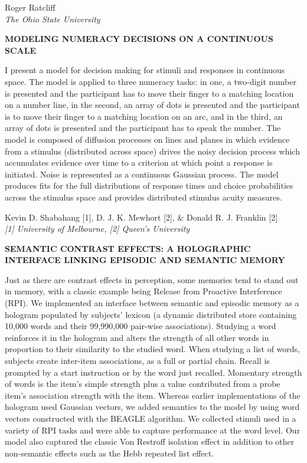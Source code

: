 \documentclass[]{article}
\begin{document}
Roger Ratcliff\\
\emph{The Ohio State University}

\textbf{MODELING NUMERACY DECISIONS ON A CONTINUOUS SCALE}

I present a model for decision making for stimuli and responses in
continuous space. The model is applied to three numeracy tasks: in one,
a two-digit number is presented and the participant has to move their
finger to a matching location on a number line, in the second, an array
of dots is presented and the participant is to move their finger to a
matching location on an arc, and in the third, an array of dots is
presented and the participant has to speak the number. The model is
composed of diffusion processes on lines and planes in which evidence
from a stimulus (distributed across space) drives the noisy decision
process which accumulates evidence over time to a criterion at which
point a response is initiated. Noise is represented as a continuous
Gaussian process. The model produces fits for the full distributions of
response times and choice probabilities across the stimulus space and
provides distributed stimulus acuity measures.\\
\pagebreak  

Kevin D. Shabahang {[}1{]}, D. J. K. Mewhort {[}2{]}, \& Donald R. J.
Franklin {[}2{]}\\
\emph{{[}1{]} University of Melbourne, {[}2{]} Queen's University}

\textbf{SEMANTIC CONTRAST EFFECTS: A HOLOGRAPHIC INTERFACE LINKING
EPISODIC AND SEMANTIC MEMORY}

Just as there are contrast effects in perception, some memories tend to
stand out in memory, with a classic example being Release from Proactive
Interference (RPI). We implemented an interface between semantic and
episodic memory as a hologram populated by subjects' lexicon (a dynamic
distributed store containing 10,000 words and their 99,990,000 pair-wise
associations). Studying a word reinforces it in the hologram and alters
the strength of all other words in proportion to their similarity to the
studied word. When studying a list of words, subjects create inter-item
associations, as a full or partial chain. Recall is prompted by a start
instruction or by the word just recalled. Momentary strength of words is
the item's simple strength plus a value contributed from a probe item's
association strength with the item. Whereas earlier implementations of
the hologram used Gaussian vectors, we added semantics to the model by
using word vectors constructed with the BEAGLE algorithm. We collected
stimuli used in a variety of RPI tasks and were able to capture
performance at the word level. Our model also captured the classic Von
Restroff isolation effect in addition to other non-semantic effects such
as the Hebb repeated list effect.\\
\pagebreak  
\end{document}
